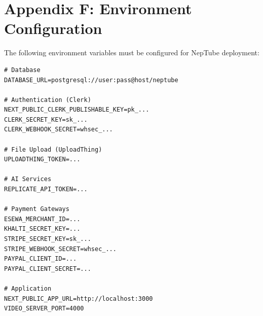 \newpage
\section*{Appendix F: Environment Configuration}
\label{app:env}

The following environment variables must be configured for NepTube deployment:

\begin{verbatim}
# Database
DATABASE_URL=postgresql://user:pass@host/neptube

# Authentication (Clerk)
NEXT_PUBLIC_CLERK_PUBLISHABLE_KEY=pk_...
CLERK_SECRET_KEY=sk_...
CLERK_WEBHOOK_SECRET=whsec_...

# File Upload (UploadThing)
UPLOADTHING_TOKEN=...

# AI Services
REPLICATE_API_TOKEN=...

# Payment Gateways
ESEWA_MERCHANT_ID=...
KHALTI_SECRET_KEY=...
STRIPE_SECRET_KEY=sk_...
STRIPE_WEBHOOK_SECRET=whsec_...
PAYPAL_CLIENT_ID=...
PAYPAL_CLIENT_SECRET=...

# Application
NEXT_PUBLIC_APP_URL=http://localhost:3000
VIDEO_SERVER_PORT=4000
\end{verbatim}

